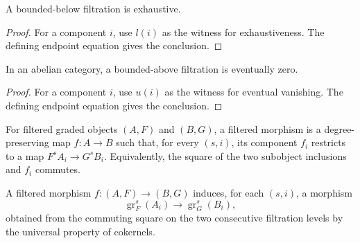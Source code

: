 \begin{lemma}
  \leanok
  \label{lem:core-bounded-below-exhaustive}
  A bounded-below filtration is exhaustive.
\end{lemma}

\begin{proof}
  \leanok
  For a component $i$, use $l(i)$ as the witness for exhaustiveness.  The
  defining endpoint equation gives the conclusion.
\end{proof}

\begin{lemma}
  \leanok
  \label{lem:core-bounded-above-eventually-zero}
  In an abelian category, a bounded-above filtration is eventually zero.
\end{lemma}

\begin{proof}
  \leanok
  For a component $i$, use $u(i)$ as the witness for eventual vanishing.  The
  defining endpoint equation gives the conclusion.
\end{proof}

\begin{definition}
  \leanok
  \label{def:core-filtered-morphism}
  For filtered graded objects $(A,F)$ and $(B,G)$, a filtered morphism is a
  degree-preserving map $f:A\to B$ such that, for every $(s,i)$, its component
  $f_i$ restricts to a map $F^sA_i\to G^sB_i$.  Equivalently, the square of
  the two subobject inclusions and $f_i$ commutes.
\end{definition}

\begin{definition}
  \leanok
  \label{def:core-associated-graded-map}
  A filtered morphism $f:(A,F)\to(B,G)$ induces, for each $(s,i)$, a morphism
  \[
    \operatorname{gr}^s_F(A_i)\longrightarrow
    \operatorname{gr}^s_G(B_i),
  \]
  obtained from the commuting square on the two consecutive filtration levels
  by the universal property of cokernels.
\end{definition}

